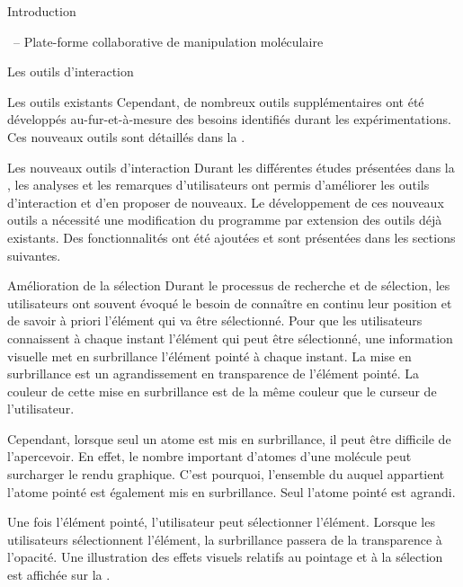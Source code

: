 \documentclass[myfrancais]{mythesis}
\begin{document}
\begin{mypart}{Introduction}
\begin{mychapter}{\myShaddock\ -- Plate-forme collaborative de manipulation moléculaire}
\begin{mysection}{Les outils d'interaction}
\begin{mysubsection}{Les outils existants}
					Cependant, de nombreux outils supplémentaires ont été développés au-fur-et-à-mesure des besoins identifiés durant les expérimentations.
					Ces nouveaux outils sont détaillés dans la .
				\end{mysubsection}
				\begin{mysubsection}{Les nouveaux outils d'interaction}
					Durant les différentes études présentées dans la , les analyses et les remarques d'utilisateurs ont permis d'améliorer les outils d'interaction et d'en proposer de nouveaux.
					Le développement de ces nouveaux outils a nécessité une modification du programme  par extension des outils déjà existants.
					Des fonctionnalités ont été ajoutées et sont présentées dans les sections suivantes.
					\begin{mysubsubsection}{Amélioration de la sélection}
						Durant le processus de recherche et de sélection, les utilisateurs ont souvent évoqué le besoin de connaître en continu leur position et de savoir à priori l'élément qui va être sélectionné.
						Pour que les utilisateurs connaissent à chaque instant l'élément qui peut être sélectionné, une information visuelle met en surbrillance l'élément pointé à chaque instant.
						La mise en surbrillance est un agrandissement en transparence de l'élément pointé.
						La couleur de cette mise en surbrillance est de la même couleur que le curseur de l'utilisateur.

						Cependant, lorsque seul un atome est mis en surbrillance, il peut être difficile de l'apercevoir.
						En effet, le nombre important d'atomes d'une molécule peut surcharger le rendu graphique.
						C'est pourquoi, l'ensemble du  auquel appartient l'atome pointé est également mis en surbrillance.
						Seul l'atome pointé est agrandi.

						Une fois l'élément pointé, l'utilisateur peut sélectionner l'élément.
						Lorsque les utilisateurs sélectionnent l'élément, la surbrillance passera de la transparence à l'opacité.
						Une illustration des effets visuels relatifs au pointage et à la sélection est affichée sur la .


\end{mysubsubsection}
\end{mysubsection}
\end{mysection}
\end{mychapter}
\end{mypart}
\end{document}
